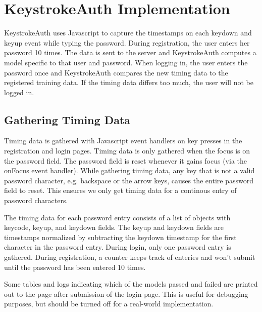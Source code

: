 \documentclass{article}
\begin{document}
\section{KeystrokeAuth Implementation}
KeystrokeAuth uses Javascript to capture the timestamps on each keydown and keyup event while typing the password.
During registration, the user enters her password 10 times.
The data is sent to the server and KeystrokeAuth computes a model specific to that user and password.
When logging in, the user enters the password once and KeystrokeAuth compares the new timing data to the registered training data.
If the timing data differs too much, the user will not be logged in.

\subsection{Gathering Timing Data}
Timing data is gathered with Javascript event handlers on key presses in the registration and login pages.
Timing data is only gathered when the focus is on the password field. The password field is reset whenever it gains focus (via the onFocus event handler).  
While gathering timing data, any key that is not a valid password character, e.g. backspace or the arrow keys, causes the entire password field to reset.
This ensures we only get timing data for a continous entry of password characters.

The timing data for each password entry consists of a list of objects with keycode, keyup, and keydown fields. The keyup and keydown fields are timestamps normalized by subtracting the keydown timestamp for the first character in the password entry. 
During login, only one password entry is gathered. During registration, a counter keeps track of enteries and won't submit until the password has been entered 10 times.

Some tables and logs indicating which of the models passed and failed are printed out to the page after submission of the login page. 
This is useful for debugging purposes, but should be turned off for a real-world implementation.
\end{document}
